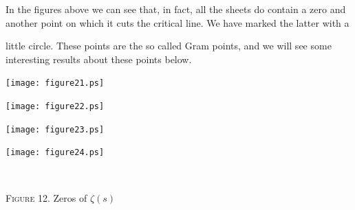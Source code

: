 \documentclass[a4paper]{amsart}
\numberwithin{equation}{section}
\begin{document}
In the figures above we can see that, in fact, all the sheets do contain a zero
and another point on which it cuts the critical line. We have marked the latter
with a\break  


\noindent  little circle.
These points are the so called Gram points, and we will
see  some interesting results about these points below.
\vfil
\noindent
\begin{minipage}{356pt}
\begin{minipage}{52.185pt} 
\texttt{[image: figure21.ps]}
\end{minipage}\hfil
\begin{minipage}{52.185pt}
\texttt{[image: figure22.ps]}
\end{minipage}\hfil
\begin{minipage}{55.86pt}
\texttt{[image: figure23.ps]}
\end{minipage}\hfil
\begin{minipage}{55.86pt}
\texttt{[image: figure24.ps]}
\end{minipage}
\centerline{\  }
\centerline{{\scshape Figure} 12. Zeros of  $\zeta(s)$}
\end{minipage}
\eject
\end{document}
